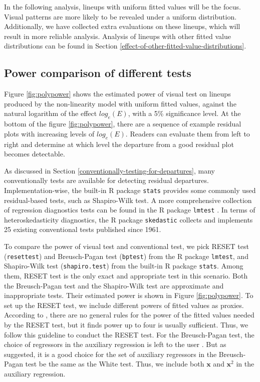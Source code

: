 \documentclass[]{interact}
\theoremstyle{plain}%
\theoremstyle{definition}
\theoremstyle{remark}
\begin{document}
In the following analysis, lineups with uniform fitted values will be
the focus. Visual patterns are more likely to be revealed under a
uniform distribution. Additionally, we have collected extra evaluations
on these lineups, which will result in more reliable analysis. Analysis
of lineups with other fitted value distributions can be found in Section
\ref{effect-of-other-fitted-value-distributions}.

\hypertarget{power-comparison-of-different-tests}{%
\subsection{Power comparison of different
tests}\label{power-comparison-of-different-tests}}

Figure \ref{fig:polypower} shows the estimated power of visual test on
lineups produced by the non-linearity model with uniform fitted values,
against the natural logarithm of the effect \(log_e(E)\), with a 5\%
significance level. At the bottom of the figure \ref{fig:polypower},
there are a sequence of example residual plots with increasing levels of
\(log_e(E)\). Readers can evaluate them from left to right and determine
at which level the departure from a good residual plot becomes
detectable.

As discussed in Section \ref{conventionally-testing-for-departures},
many conventionally tests are available for detecting residual
departures. Implementation-wise, the built-in R package \texttt{stats}
provides some commonly used residual-based tests, such as Shapiro-Wilk
test. A more comprehensive collection of regression diagnostics tests
can be found in the R package \texttt{lmtest} \citep{lmtest}. In terms
of heteroskedasticity diagnostics, the R package \texttt{skedastic}
\citep{skedastic} collects and implements 25 existing conventional tests
published since 1961.

To compare the power of visual test and conventional test, we pick RESET
test (\texttt{resettest}) and Breusch-Pagan test (\texttt{bptest}) from
the R package \texttt{lmtest}, and Shapiro-Wilk test
(\texttt{shapiro.test}) from the built-in R package \texttt{stats}.
Among them, RESET test is the only exact and appropriate test in this
scenario. Both the Breusch-Pagan test and the Shapiro-Wilk test are
approximate and inappropriate tests. Their estimated power is shown in
Figure \ref{fig:polypower}. To set up the RESET test, we include
different powers of fitted values as proxies. According to
\citet{ramsey_tests_1969}, there are no general rules for the power of
the fitted values needed by the RESET test, but it finds power up to
four is usually sufficient. Thus, we follow this guideline to conduct
the RESET test. For the Breusch-Pagan test, the choice of regressors in
the auxiliary regression is left to the user
\citep{breusch_simple_1979}. But as \citet{waldman1983note} suggested,
it is a good choice for the set of auxiliary regressors in the
Breusch-Pagan test be the same as the White test. Thus, we include both
\(\boldsymbol{x}\) and \(\boldsymbol{x}^2\) in the auxiliary regression.
\end{document}
